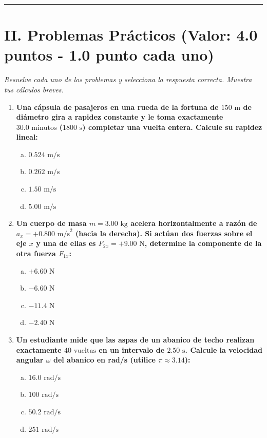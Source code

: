 \documentclass[11pt,a4paper]{article}
\begin{document}
\hrule
\section*{II. Problemas Prácticos (Valor: 4.0 puntos - 1.0 punto cada uno)}
\textit{Resuelve cada uno de los problemas y selecciona la respuesta correcta. Muestra tus cálculos breves.}

\begin{enumerate}
    \item \textbf{Una cápsula de pasajeros en una rueda de la fortuna de $150 \text{ m}$ de diámetro gira a rapidez constante y le toma exactamente $30.0 \text{ minutos}$ ($1800 \text{ s}$) completar una vuelta entera. Calcule su rapidez lineal:}
    \begin{enumerate}[a)]
        \item $0.524 \text{ m/s}$
        \item $0.262 \text{ m/s}$
        \item $1.50 \text{ m/s}$
        \item $5.00 \text{ m/s}$
    \end{enumerate}

    \item \textbf{Un cuerpo de masa $m = 3.00 \text{ kg}$ acelera horizontalmente a razón de $a_x = +0.800 \text{ m/s}^2$ (hacia la derecha). Si actúan dos fuerzas sobre el eje $x$ y una de ellas es $F_{2x} = +9.00 \text{ N}$, determine la componente de la otra fuerza $F_{1x}$:}
    \begin{enumerate}[a)]
        \item $+6.60 \text{ N}$
        \item $-6.60 \text{ N}$
        \item $-11.4 \text{ N}$
        \item $-2.40 \text{ N}$
    \end{enumerate}

    \item \textbf{Un estudiante mide que las aspas de un abanico de techo realizan exactamente $40 \text{ vueltas}$ en un intervalo de $2.50 \text{ s}$. Calcule la velocidad angular $\omega$ del abanico en rad/s (utilice $\pi \approx 3.14$):}
    \begin{enumerate}[a)]
        \item $16.0 \text{ rad/s}$
        \item $100 \text{ rad/s}$
        \item $50.2 \text{ rad/s}$
        \item $251 \text{ rad/s}$
    \end{enumerate}


\end{enumerate}
\end{document}

